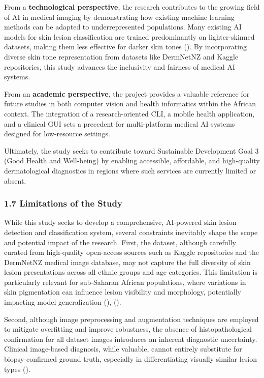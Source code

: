 \documentclass[
  12pt,
  oneside]{article}
\begin{document}
From a \textbf{technological perspective}, the research contributes to
the growing field of AI in medical imaging by demonstrating how existing
machine learning methods can be adapted to underrepresented populations.
Many existing AI models for skin lesion classification are trained
predominantly on lighter-skinned datasets, making them less effective
for darker skin tones (). By incorporating diverse skin tone representation from datasets
like DermNetNZ and Kaggle repositories, this study advances the
inclusivity and fairness of medical AI systems.

From an \textbf{academic perspective}, the project provides a valuable
reference for future studies in both computer vision and health
informatics within the African context. The integration of a
research-oriented CLI, a mobile health application, and a clinical GUI
sets a precedent for multi-platform medical AI systems designed for
low-resource settings.

Ultimately, the study seeks to contribute toward Sustainable Development
Goal 3 (Good Health and Well-being) by enabling accessible, affordable,
and high-quality dermatological diagnostics in regions where such
services are currently limited or absent.

\subsubsection{1.7 Limitations of the
Study}\label{limitations-of-the-study}

While this study seeks to develop a comprehensive, AI-powered skin
lesion detection and classification system, several constraints
inevitably shape the scope and potential impact of the research. First,
the dataset, although carefully curated from high-quality open-access
sources such as Kaggle repositories and the DermNetNZ medical image
database, may not capture the full diversity of skin lesion
presentations across all ethnic groups and age categories. This
limitation is particularly relevant for sub-Saharan African populations,
where variations in skin pigmentation can influence lesion visibility
and morphology, potentially impacting model generalization
(),
().

Second, although image preprocessing and augmentation techniques are
employed to mitigate overfitting and improve robustness, the absence of
histopathological confirmation for all dataset images introduces an
inherent diagnostic uncertainty. Clinical image-based diagnosis, while
valuable, cannot entirely substitute for biopsy-confirmed ground truth,
especially in differentiating visually similar lesion types
().
\end{document}
